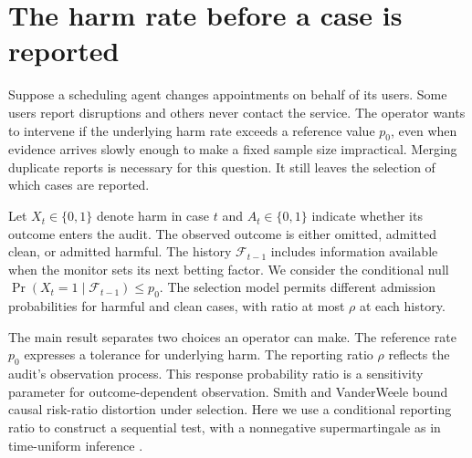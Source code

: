 \documentclass[11pt]{article}
\begin{document}
\section{The harm rate before a case is reported}
Suppose a scheduling agent changes appointments on behalf of
its users. Some users report disruptions and others never contact
the service. The operator wants to intervene if the underlying
harm rate exceeds a reference value $p_0$, even when evidence
arrives slowly enough to make a fixed sample size impractical.
Merging duplicate reports is necessary for this question. It
still leaves the selection of which cases are reported.

Let $X_t\in\{0,1\}$ denote harm in case $t$ and
$A_t\in\{0,1\}$ indicate whether its outcome enters the audit.
The observed outcome is either omitted, admitted clean, or admitted
harmful. The history $\mathcal F_{t-1}$ includes information available
when the monitor sets its next betting factor. We consider the
conditional null $\Pr(X_t=1\mid\mathcal F_{t-1})\le p_0$.
The selection model permits different admission probabilities
for harmful and clean cases, with ratio at most $\rho$ at each history.

The main result separates two choices an operator can make.
The reference rate $p_0$ expresses a tolerance for underlying harm.
The reporting ratio $\rho$ reflects the audit's observation process.
This response probability ratio is a sensitivity parameter for
outcome-dependent observation. Smith and VanderWeele \cite{smith}
bound causal risk-ratio distortion under selection. Here we use
a conditional reporting ratio to construct a sequential test,
with a nonnegative supermartingale as in time-uniform inference
\cite{howard}.
\end{document}
